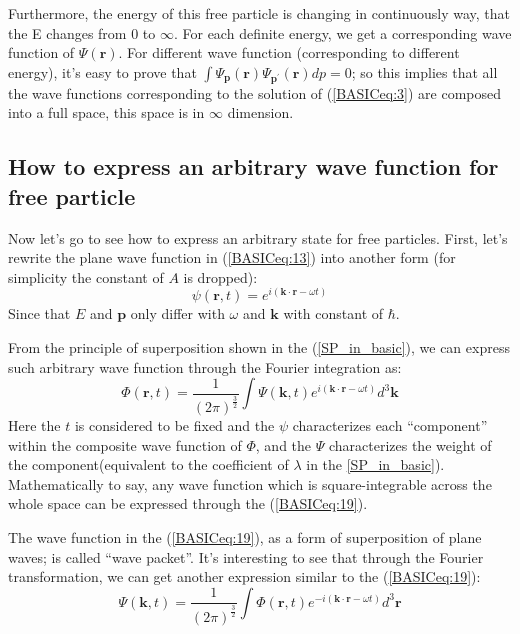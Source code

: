 Furthermore, the energy of this free particle is changing in
continuously way, that the E changes from $0$ to $\infty$. For each
definite energy, we get a corresponding wave function of
$\Psi(\bm{r})$. For different wave function (corresponding to
different energy), it's easy to prove that
$\int\Psi_{\bm{p}}(\bm{r})\Psi_{\bm{p}^{'}}(\bm{r})dp = 0$; so this
implies that all the wave functions corresponding to the solution of
(\ref{BASICeq:3}) are composed into a full space, this space is in
$\infty$ dimension.



\subsection{How to express an arbitrary wave function for free particle }
\label{sec:HTEAAWFFFP_in_basic}

Now let's go to see how to express an arbitrary state for free
particles. First, let's rewrite the plane wave function in
(\ref{BASICeq:13}) into another form (for simplicity the constant of
$A$ is dropped):
\begin{equation}
  \label{BASICeq:18}
  \psi(\bm{r},t) = e^{i(\bm{k}\cdot\bm{r} - \omega t)}
\end{equation}
Since that $E$ and $\bm{p}$ only differ with $\omega$ and $\bm{k}$
with constant of $\hbar$.

From the principle of superposition shown in the (\ref{SP_in_basic}),
we can express such arbitrary wave function through the Fourier
integration as:
\begin{equation}
  \label{BASICeq:19}
  \Phi (\bm{r}, t) = \frac{1}{(2\pi)^{\frac{3}{2}}}\int \Psi(\bm{k}, t)
e^{i(\bm{k}\cdot\bm{r} - \omega t)}d^{3}\bm{k}
\end{equation}
Here the $t$ is considered to be fixed and the $\psi$ characterizes
each ``component'' within the composite wave function of $\Phi$, and
the $\Psi$ characterizes the weight of the component(equivalent to the
coefficient of $\lambda$ in the \ref{SP_in_basic}). Mathematically to
say, any wave function which is square-integrable across the whole
space can be expressed through the (\ref{BASICeq:19}).

The wave function in the (\ref{BASICeq:19}), as a form of
superposition of plane waves; is called ``wave packet''. It's
interesting to see that through the Fourier transformation, we can get
another expression similar to the (\ref{BASICeq:19}):
\begin{equation}
  \label{BASICeq:20}
    \Psi (\bm{k}, t) = \frac{1}{(2\pi)^{\frac{3}{2}}}\int \Phi(\bm{r}, t)
e^{-i(\bm{k}\cdot\bm{r} - \omega t)}d^{3}\bm{r}
\end{equation}

